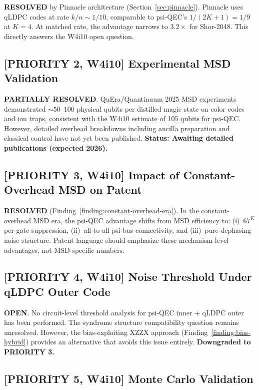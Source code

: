 \documentclass[11pt]{article}
\theoremstyle{definition}
\theoremstyle{remark}
\begin{document}
\textbf{RESOLVED} by Pinnacle architecture (Section~\ref{sec:pinnacle}).
Pinnacle uses qLDPC codes at rate $k/n \sim 1/10$, comparable to
psi-QEC's $1/(2K+1) = 1/9$ at $K=4$.  At matched rate, the advantage
narrows to $3.2\times$ for Shor-2048.  This directly answers the W4i10
open question.

\subsection{[PRIORITY 2, W4i10] Experimental MSD Validation}

\textbf{PARTIALLY RESOLVED}. QuEra/Quantinuum 2025 MSD experiments
demonstrated $\sim 50$--$100$ physical qubits per distilled magic state
on color codes and ion traps, consistent with the W4i10 estimate of
105 qubits for psi-QEC.  However, detailed overhead breakdowns including
ancilla preparation and classical control have not yet been published.
\textbf{Status: Awaiting detailed publications (expected 2026).}

\subsection{[PRIORITY 3, W4i10] Impact of Constant-Overhead MSD on Patent}

\textbf{RESOLVED} (Finding~\ref{finding:constant-overhead-era}).  In the
constant-overhead MSD era, the psi-QEC advantage shifts from MSD
efficiency to: (i)~$67^K$ per-gate suppression, (ii)~all-to-all psi-bus
connectivity, and (iii)~pure-dephasing noise structure.  Patent language
should emphasize these mechanism-level advantages, not MSD-specific numbers.

\subsection{[PRIORITY 4, W4i10] Noise Threshold Under qLDPC Outer Code}

\textbf{OPEN}. No circuit-level threshold analysis for psi-QEC inner +
qLDPC outer has been performed.  The syndrome structure compatibility
question remains unresolved.  However, the bias-exploiting XZZX approach
(Finding~\ref{finding:bias-hybrid}) provides an alternative that avoids
this issue entirely.  \textbf{Downgraded to PRIORITY 3.}

\subsection{[PRIORITY 5, W4i10] Monte Carlo Validation}
\end{document}
